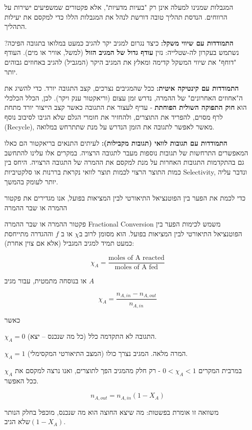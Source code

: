 \documentclass[
  hebrew,
  letterpaper,
  DIV=11,
  numbers=noendperiod]{scrreprt}
\begin{document}
המגבלות שמנינו למעלה אינן רק "בעיות מדעיות", אלא פקטורים שמשפיעים ישירות
על הרווחים. הנדסת תהליך טובה דורשת לנהל את המגבלות הללו כדי למקסם את
יעילות התהליך.

\textbf{התמודדות עם שיווי משקל:} כיצד נגרום למגיב יקר להגיב כמעט במלואו
בתגובה הפיכה? נשתמש בעקרון לה-שטלייה: נזין \textbf{עודף גדול של המגיב
הזול} (למשל, אוויר או מים). העודף "דוחף" את שיווי המשקל קדימה ומאלץ את
המגיב היקר (המגביל) להגיב באחוזים גבוהים יותר.

\textbf{התמודדות עם קינטיקה איטית:} ככל שהמגיבים נצרכים, קצב התגובה
יורד. כדי להשיג את ה"אחוזים האחרונים" של ההמרה, נדרש זמן עצום (וריאקטור
ענק ויקר). לכן, הכלל הכלכלי הוא \textbf{חוק התפוקה השולית הפוחתת} - עדיף
לעצור את התגובה כאשר קצב הייצור יורד מתחת לרף מסוים, להפריד את התוצרים,
ולהחזיר את חומרי הגלם שלא הגיבו לסיבוב נוסף (Recycle), מאשר לאפשר לתגובה
את הזמן הנדרש על מנת שתתרחש במלואה.

\textbf{התמודדות עם תגובות לוואי (תגובות מקבילות):} לעיתים התנאים
בריאקטור הם כאלו המאפשרים התרחשות של תגובות נוספות מעבר לתגובה הרצויה.
במקרים אלו עלינו להתחשב גם בהתקדמות התגובות האחרות על מנת למקסם את ההמרה
של התגובה הרצויה. היחס בין כמות התוצר הרצוי לכמות תוצר לוואי נקראת
בררנות או סלקטיביות Selectivity, ונדבר עליה יותר לעומק בהמשך.

כדי לכמת את הפער בין הפוטנציאל התיאורטי לבין המציאות בפועל, אנו מגדירים
את פקטור ההמרה או שבר ההמרה

פקטור ההמרה או שבר ההמרה Fractional Conversion משמש לכימות הפער בין
הפוטנציאל התיאורטי לבין המציאות בפועל. הוא מסומן לרוב ב\(\chi\) או ב
\(f\) וההגדרה מתייחסת כמעט תמיד למגיב המגביל (אלא אם צוין אחרת):

\[\chi_{A} = \frac{\text{moles of A reacted}}{\text{moles of A fed}}\]

או בנוסחה מתמטית, עבור מגיב \(A\)

\[\chi_{A} = \frac{n_{A,in} - n_{A,out}}{n_{A,in}}\]

כאשר

\(\chi_{A} = 0\) התגובה לא התקדמה כלל (כל מה שנכנס -- יצא).

\(\chi_{A} = 1\) המרה מלאה. המגיב נצרך כולו (המצב התיאורטי המקסימלי).

במרבית המקרים \(0 < \chi_{A} < 1\) - רק חלק מהמגיב הפך לתוצרים, ואנו
נרצה למקסם את \(\chi_{A}\) ככל האפשר.

\[n_{A,out} = n_{A,in}\left( 1 - X_{A} \right)\]

משוואה זו אומרת בפשטות: מה שיצא החוצה הוא מה שנכנס, מוכפל בחלק הנותר
\(\left( 1 - X_{A} \right)\)שלא הגיב.
\end{document}
